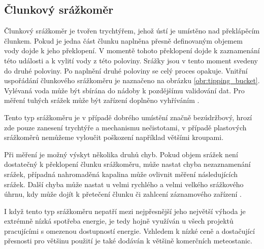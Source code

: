 \subsection{Člunkový srážkoměr}
\par Člunkový srážkoměr je tvořen trychtýřem, jehož ústí je umístěno nad překlápěcím člunkem. Pokud je jedna část člunku naplněna přesně definovaným objemem vody dojde k jeho překlopení. V momentě tohoto překlopení dojde k zaznamenání této události a k vylití vody z této poloviny. Srážky jsou v tento moment svedeny do druhé poloviny. Po naplnění druhé poloviny se celý proces opakuje. Vnitřní uspořádání člunkového srážkoměru je naznačeno na obrázku \ref{obr:tipping_bucket}. Vylévaná voda může být sbírána do nádoby k pozdějšímu validování dat. Pro měření tuhých srážek může být zařízení doplněno vyhříváním \cite{nkURfCvWR2piX49C}.
\par Tento typ srážkoměru je v případě dobrého umístění značně bezúdržbový, hrozí zde pouze zanesení trychtýře a mechanismu nečistotami, v případě plastových srážkoměrů nemůžeme vyloučit poškození například většími kroupami.
\par Při měření je možný výskyt několika druhů chyb. Pokud objem srážek není dostatečný k překlopení člunku srážkoměru, může nastat chyba nezaznamenání srážek, případná nahromaděná kapalina může ovlivnit měření následujících srážek. Další chyba může nastat u velmi rychlého a velmi velkého srážkového úhrnu, kdy může dojít k přetečení člunku či zahlcení záznamového zařízení \cite{ggXzrltWxOZUtGvb, Lewlomphaisarl}.
\par I když tento typ srážkoměru nepatří mezi nejpřesnější jeho největší výhoda je extrémně nízká spotřeba energie, je tedy hojně využíván u všech projektů pracujícími s omezenou dostupností energie. Vzhledem k nízké ceně a dostačující přesnosti pro většinu použití je také dodáván k většině komerčních meteostanic.
